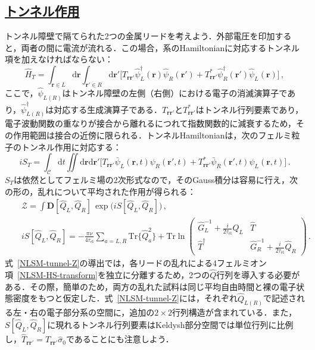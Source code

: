 \documentclass[a4paper,11pt]{ltjsarticle}
\newcommand{\subsectionlink}[1]{\subsection[#1]{\hyperlink{toc}{#1}}}
\def\Tr{\mathrm{Tr}}
\def\d{\mathrm{d}}
\def\D{\mathbf{D}}
\def\tauel{\tau_{\mathrm{el}}}
\begin{document}

\subsectionlink{トンネル作用}\label{sec_NLSM-3}



トンネル障壁で隔てられた2つの金属リードを考えよう．外部電圧を印加すると，両者の間に電流が流れる．この場合，系のHamiltonianに対応するトンネル項を加えなければならない：
$$\hat{H}_{T}=\int_{\mathbf{r}\in
L}\d\mathbf{r}\int_{\mathbf{r}'\in
R}\d\mathbf{r}'\big[T^{\phantom{*}}_{\mathbf{rr}'}
\hat{\psi}^{\dag}_{L}(\mathbf{r})
\hat{\psi}^{\phantom{\dag}}_{R}(\mathbf{r}')+T^{*}_{\mathbf{rr}'}
\hat{\psi}^{\dag}_{R}(\mathbf{r}')\hat{\psi}^{\phantom{\dag}}_{L}(\mathbf{r})\big]\,,$$
ここで，$\hat{\psi}_{L(R)}$はトンネル障壁の左側（右側）における電子の消滅演算子であり，$\hat{\psi}^{\dag}_{L(R)}$は対応する生成演算子である．$T^{\phantom{*}}_{\mathbf{rr}'}$と$T^{*}_{\mathbf{rr}'}$はトンネル行列要素であり，電子波動関数の重なりが接合から離れるにつれて指数関数的に減衰するため，その作用範囲は接合の近傍に限られる．トンネルHamiltonianは，次のフェルミ粒子のトンネル作用に対応する：
$$iS_{T}=\int_{\mathcal{C}}\d
t\iint\d\mathbf{r}\d\mathbf{r}' \big[T^{\phantom{*}}_{\mathbf{rr}'}
\bar{\psi}_{L}(\mathbf{r},t)
\psi_{R}(\mathbf{r}',t)+T^{*}_{\mathbf{rr}'}
\bar{\psi}_{R}(\mathbf{r}',t)\psi_{L}(\mathbf{r},t)\big]\,.$$
$S_{T}$は依然としてフェルミ場の2次形式なので，そのGauss積分は容易に行え，次の形の，乱れについて平均された作用が得られる：
\begin{eqnarray}\label{NLSM-tunnel-Z}
&&\mathcal{Z}=\int\D[\hat Q_{L}, \hat Q_{R}]\,\exp\big(iS[\hat Q_{L},\hat Q_{R}]\big)\,,\nonumber
\\
&&iS[\hat Q_{L}, \hat
Q_{R}]=-\frac{\pi\nu}{4\tauel}\sum_{a=L,R}\Tr\big\{\hat{Q}^{2}_{a}\big\}
+\Tr\ln\left(\begin{array}{cc}
\hat{G}_L^{-1}+\frac{i}{2\tauel}\hat{Q}_{L} & \hat{T} \\
\hat{T}^{\dag} & \hat{G}_R^{-1}+\frac{i}{2\tauel}\hat{Q}_{R}
\end{array}\right)\,.
\end{eqnarray}
式~\eqref{NLSM-tunnel-Z}の導出では，各リードの乱れによる4フェルミオン項~\eqref{NLSM-HS-transform}を独立に分離するため，2つの$\hat Q$行列を導入する必要がある．その際，簡単のため，両方の乱れた試料は同じ平均自由時間と裸の電子状態密度をもつと仮定した．式~\eqref{NLSM-tunnel-Z}には，それぞれ$\hat{Q}_{L(R)}$で記述される左・右の電子部分系の空間に，追加の$2\times2$行列構造が含まれている．また，$S[\hat{Q}_{L},\hat{Q}_{R}]$に現れるトンネル行列要素はKeldysh部分空間では単位行列に比例し，$\hat{T}_{\mathbf{rr}'}=T_{\mathbf{rr}'}\hat{\sigma}_{0}$であることにも注意しよう．
\end{document}
